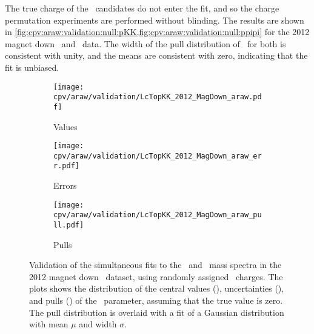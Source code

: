 
The true charge of the \PLambdac\ candidates do not enter the fit, and so the 
charge permutation experiments are performed without blinding.
The results are shown in 
\cref{fig:cpv:araw:validation:null:pKK,fig:cpv:araw:validation:null:ppipi} for 
the 2012 magnet down \pKK\ and \ppipi\ data.
The width of the pull distribution of \ARaw\ for both is consistent with unity, 
and the means are consistent with zero, indicating that the fit is unbiased.

\begin{figure}
  \begin{subfigure}[t]{0.32\textwidth}
    \texttt{[image: cpv/araw/validation/LcTopKK\_2012\_MagDown\_araw.pdf]}
    \caption{Values}
    \label{fig:cpv:araw:validation:null:pKK:values}
  \end{subfigure}
  \begin{subfigure}[t]{0.32\textwidth}
    \texttt{[image: cpv/araw/validation/LcTopKK\_2012\_MagDown\_araw\_err.pdf]}
    \caption{Errors}
    \label{fig:cpv:araw:validation:null:pKK:errors}
  \end{subfigure}
  \begin{subfigure}[t]{0.32\textwidth}
    \texttt{[image: cpv/araw/validation/LcTopKK\_2012\_MagDown\_araw\_pull.pdf]}
    \caption{Pulls}
    \label{fig:cpv:araw:validation:null:pKK:pulls}
  \end{subfigure}
  \caption{%
    Validation of the simultaneous fits to the \PLambdac\ and \APLambdac\ mass 
    spectra in the 2012 magnet down \pKK\ dataset, using randomly assigned 
    \PLambdac\ charges.
    The plots shows the distribution of the central values 
    (), uncertainties 
    (), and pulls 
    () of the \ARaw\ parameter, 
    assuming that the true value is zero.
    The pull distribution is overlaid with a fit of a Gaussian distribution 
    with mean $\mu$ and width $\sigma$.
  }
  \label{fig:cpv:araw:validation:null:pKK}
\end{figure}


